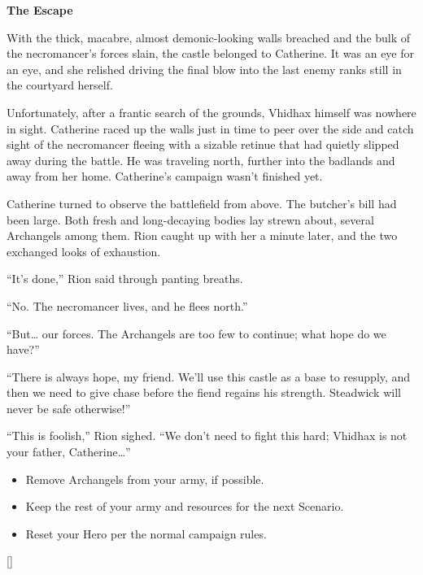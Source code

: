 \begin{multicols*}{2}
\textbf{The Escape}

With the thick, macabre, almost demonic-looking walls breached and the bulk of the necromancer's forces slain, the castle belonged to Catherine.
It was an eye for an eye, and she relished driving the final blow into the last enemy ranks still in the courtyard herself.

Unfortunately, after a frantic search of the grounds, Vhidhax himself was nowhere in sight.
Catherine raced up the walls just in time to peer over the side and catch sight of the necromancer fleeing with a sizable retinue that had quietly slipped away during the battle.
He was traveling north, further into the badlands and away from her home.
Catherine's campaign wasn't finished yet.

Catherine turned to observe the battlefield from above.
The butcher's bill had been large.
Both fresh and long-decaying bodies lay strewn about, several Archangels among them.
Rion caught up with her a minute later, and the two exchanged looks of exhaustion.

``It's done,'' Rion said through panting breaths.

``No.
The necromancer lives, and he flees north.''

``But… our forces.
The Archangels are too few to continue; what hope do we have?''

``There is always hope, my friend.
We'll use this castle as a base to resupply, and then we need to give chase before the fiend regains his strength.
Steadwick will never be safe otherwise!''

``This is foolish,'' Rion sighed.
``We don't need to fight this hard; Vhidhax is not your father, Catherine…''

\begin{itemize}
  \item \textcolor{darkcandyapplered}{Remove Archangels from your army, if possible.}
  \item \textcolor{darkcandyapplered}{Keep the rest of your army and resources for the next Scenario.}
  \item \textcolor{darkcandyapplered}{Reset your Hero per the normal campaign rules.}
\end{itemize}

\vspace{2em}
\begin{center}
  \raisebox{0pt}[\dimexpr{}\baselineskip\relax]{}
\end{center}

\end{multicols*}

